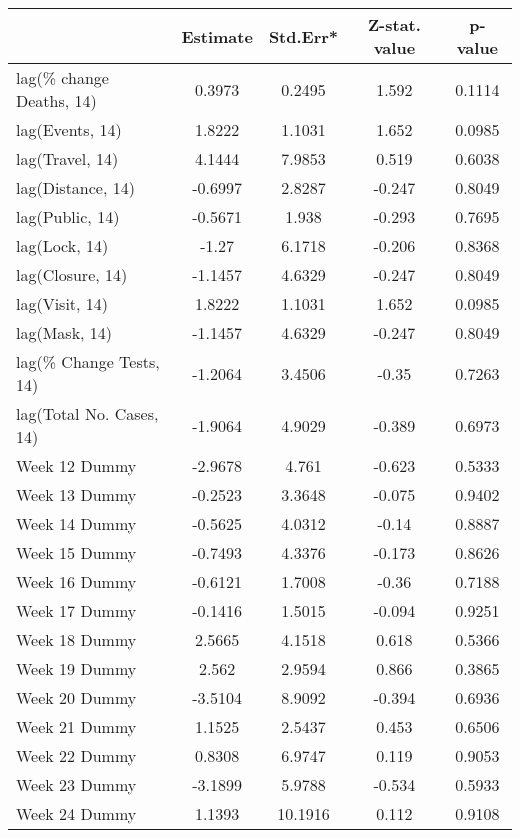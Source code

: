 \begingroup\tiny
\begin{longtable}{lcccc}
  \toprule
 & Estimate & Std.Err* & Z-stat. value & p-value \\ 
  \midrule
lag(\% change Deaths, 14) & 0.3973 & 0.2495 & 1.592 & 0.1114 \\ 
  lag(Events, 14) & 1.8222 & 1.1031 & 1.652 & 0.0985 \\ 
  lag(Travel, 14) & 4.1444 & 7.9853 & 0.519 & 0.6038 \\ 
  lag(Distance, 14) & -0.6997 & 2.8287 & -0.247 & 0.8049 \\ 
  lag(Public, 14) & -0.5671 & 1.938 & -0.293 & 0.7695 \\ 
  lag(Lock, 14) & -1.27 & 6.1718 & -0.206 & 0.8368 \\ 
  lag(Closure, 14) & -1.1457 & 4.6329 & -0.247 & 0.8049 \\ 
  lag(Visit, 14) & 1.8222 & 1.1031 & 1.652 & 0.0985 \\ 
  lag(Mask, 14) & -1.1457 & 4.6329 & -0.247 & 0.8049 \\ 
  lag(\% Change Tests, 14) & -1.2064 & 3.4506 & -0.35 & 0.7263 \\ 
  lag(Total No. Cases, 14) & -1.9064 & 4.9029 & -0.389 & 0.6973 \\ 
  Week 12 Dummy & -2.9678 & 4.761 & -0.623 & 0.5333 \\ 
  Week 13 Dummy & -0.2523 & 3.3648 & -0.075 & 0.9402 \\ 
  Week 14 Dummy & -0.5625 & 4.0312 & -0.14 & 0.8887 \\ 
  Week 15 Dummy & -0.7493 & 4.3376 & -0.173 & 0.8626 \\ 
  Week 16 Dummy & -0.6121 & 1.7008 & -0.36 & 0.7188 \\ 
  Week 17 Dummy & -0.1416 & 1.5015 & -0.094 & 0.9251 \\ 
  Week 18 Dummy & 2.5665 & 4.1518 & 0.618 & 0.5366 \\ 
  Week 19 Dummy & 2.562 & 2.9594 & 0.866 & 0.3865 \\ 
  Week 20 Dummy & -3.5104 & 8.9092 & -0.394 & 0.6936 \\ 
  Week 21 Dummy & 1.1525 & 2.5437 & 0.453 & 0.6506 \\ 
  Week 22 Dummy & 0.8308 & 6.9747 & 0.119 & 0.9053 \\ 
  Week 23 Dummy & -3.1899 & 5.9788 & -0.534 & 0.5933 \\ 
  Week 24 Dummy & 1.1393 & 10.1916 & 0.112 & 0.9108 \\ 

\end{longtable}
